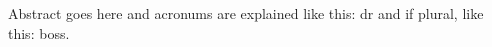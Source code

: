 
Abstract goes here and acronums are explained like this: \ac{dr} and if plural, like this: \acp{bos}.

